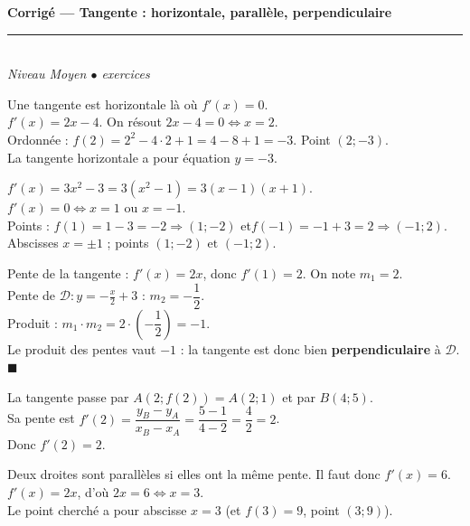 \documentclass[11pt,a4paper]{article}
\begin{document}
\begin{center}
{\LARGE\bfseries\color{primarydark} Corrigé --- Tangente : horizontale, parallèle, perpendiculaire}\\[2pt]
{\color{primary}\rule{0.5\textwidth}{1.2pt}}\\[4pt]
{\small\itshape Niveau Moyen \quad$\bullet$ exercices}
\end{center}
\vspace{2mm}

\begin{corr}[1 --- tangente horizontale de $f(x)=x^2-4x+1$]
Une tangente est horizontale là où $f'(x)=0$.\\
$f'(x)=2x-4$. On résout $2x-4=0\iff x=2$.\\
Ordonnée : $f(2)=2^2-4\cdot 2+1=4-8+1=-3$. Point $(2;-3)$.\\
La tangente horizontale a pour équation $\boxed{y=-3}$.
\end{corr}

\begin{corr}[2 --- tangentes horizontales de $f(x)=x^3-3x$]
$f'(x)=3x^2-3=3(x^2-1)=3(x-1)(x+1)$.\\
$f'(x)=0\iff x=1$ ou $x=-1$.\\
Points : $f(1)=1-3=-2\Rightarrow(1;-2)$ \quad et\quad $f(-1)=-1+3=2\Rightarrow(-1;2)$.\\
Abscisses $\boxed{x=\pm 1}$ ; points $\boxed{(1;-2)\text{ et }(-1;2)}$.
\end{corr}

\begin{corr}[3 --- perpendicularité pour $f(x)=x^2$ en $x_0=1$]
Pente de la tangente : $f'(x)=2x$, donc $f'(1)=2$. On note $m_1=2$.\\
Pente de $\mathcal{D}:y=-\tfrac{x}{2}+3$ : $m_2=-\dfrac12$.\\
Produit : $m_1\cdot m_2=2\cdot\left(-\dfrac12\right)=-1$.\\
Le produit des pentes vaut $-1$ : la tangente est donc bien \textbf{perpendiculaire} à $\mathcal{D}$. $\blacksquare$
\end{corr}

\begin{corr}
La tangente passe par $A(2;f(2))=A(2;1)$ et par $B(4;5)$.\\
Sa pente est $f'(2)=\dfrac{y_B-y_A}{x_B-x_A}=\dfrac{5-1}{4-2}=\dfrac{4}{2}=2$.\\
Donc $\boxed{f'(2)=2}$.
\end{corr}

\begin{corr}[5 --- tangente parallèle à $y=6x-1$ pour $f(x)=x^2$]
Deux droites sont parallèles si elles ont la même pente. Il faut donc $f'(x)=6$.\\
$f'(x)=2x$, d'où $2x=6\iff x=3$.\\
Le point cherché a pour abscisse $\boxed{x=3}$ (et $f(3)=9$, point $(3;9)$).
\end{corr}
\end{document}
